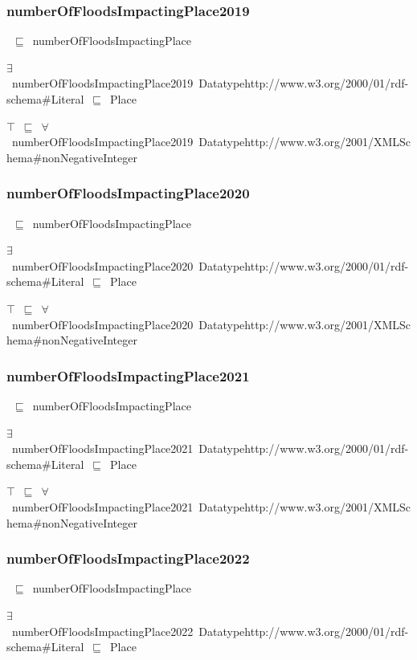\documentclass{article}
\begin{document}
\subsubsection*{numberOfFloodsImpactingPlace2019}

~\ensuremath{\sqsubseteq}~numberOfFloodsImpactingPlace

\ensuremath{\exists}~numberOfFloodsImpactingPlace2019~Datatypehttp://www.w3.org/2000/01/rdf-schema#Literal~\ensuremath{\sqsubseteq}~Place

\ensuremath{\top}~\ensuremath{\sqsubseteq}~\ensuremath{\forall}~numberOfFloodsImpactingPlace2019~Datatypehttp://www.w3.org/2001/XMLSchema#nonNegativeInteger

\subsubsection*{numberOfFloodsImpactingPlace2020}

~\ensuremath{\sqsubseteq}~numberOfFloodsImpactingPlace

\ensuremath{\exists}~numberOfFloodsImpactingPlace2020~Datatypehttp://www.w3.org/2000/01/rdf-schema#Literal~\ensuremath{\sqsubseteq}~Place

\ensuremath{\top}~\ensuremath{\sqsubseteq}~\ensuremath{\forall}~numberOfFloodsImpactingPlace2020~Datatypehttp://www.w3.org/2001/XMLSchema#nonNegativeInteger

\subsubsection*{numberOfFloodsImpactingPlace2021}

~\ensuremath{\sqsubseteq}~numberOfFloodsImpactingPlace

\ensuremath{\exists}~numberOfFloodsImpactingPlace2021~Datatypehttp://www.w3.org/2000/01/rdf-schema#Literal~\ensuremath{\sqsubseteq}~Place

\ensuremath{\top}~\ensuremath{\sqsubseteq}~\ensuremath{\forall}~numberOfFloodsImpactingPlace2021~Datatypehttp://www.w3.org/2001/XMLSchema#nonNegativeInteger

\subsubsection*{numberOfFloodsImpactingPlace2022}

~\ensuremath{\sqsubseteq}~numberOfFloodsImpactingPlace

\ensuremath{\exists}~numberOfFloodsImpactingPlace2022~Datatypehttp://www.w3.org/2000/01/rdf-schema#Literal~\ensuremath{\sqsubseteq}~Place
\end{document}

